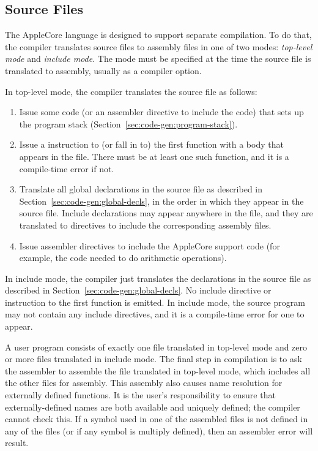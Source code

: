 \documentclass[10pt]{article}
\begin{document}
\subsection{Source Files}
\label{sec:code-gen:source-files}

The AppleCore language is designed to support separate compilation.
To do that, the compiler translates source files to assembly files in
one of two modes: \emph{top-level mode} and \emph{include mode}.  The
mode must be specified at the time the source file is translated to
assembly, usually as a compiler option.

  In top-level mode, the compiler translates
the source file as follows:
%
\begin{enumerate}
%
\item Issue some code (or an assembler directive to include the code)
  that sets up the program stack
  (Section~\ref{sec:code-gen:program-stack}).
%
\item Issue a  instruction to (or fall in to) the first
  function with a body that appears in the file.  There must be at
  least one such function, and it is a compile-time error if not.
%
\item Translate all global declarations in the source file as
  described in Section~\ref{sec:code-gen:global-decls}, in the
  order in which they appear in the source file.  Include declarations
  may appear anywhere in the file, and they are translated to
  directives to include the corresponding assembly files.
%
\item Issue assembler directives to include the AppleCore support code
  (for example, the code needed to do arithmetic operations).
%
\end{enumerate}

 In include mode, the compiler just translates
the declarations in the source file as described in
Section~\ref{sec:code-gen:global-decls}.  No include directive or
 instruction to the first function is emitted.  In include
mode, the source program may not contain any include directives, and
it is a compile-time error for one to appear.

 A user program consists
of exactly one file translated in top-level mode and zero or more
files translated in include mode.  The final step in compilation is to
ask the assembler to assemble the file translated in top-level mode,
which includes all the other files for assembly.  This assembly also
causes name resolution for externally defined functions.  It is the
user's responsibility to ensure that externally-defined names are both
available and uniquely defined; the compiler cannot check this.  If a
symbol used in one of the assembled files is not defined in any of the
files (or if any symbol is multiply defined), then an assembler error
will result.
\end{document}

